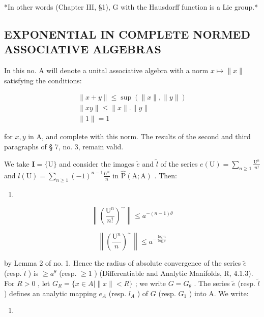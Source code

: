 *In other words (Chapter III, §1), G with the Hausdorff function is a Lie group.*

\subsection{EXPONENTIAL IN COMPLETE NORMED ASSOCIATIVE ALGEBRAS}

In this no. A will denote a unital associative algebra with a norm \(x \mapsto \| x \|\) satisfying the conditions:

\[
\begin{array}{c} \| x + y \| \leqslant \sup (\| x \|, \| y \|) \\ \| x y \| \leqslant \| x \|. \| y \| \\ \| 1 \| = 1 \end{array}
\]

for \(x, y\) in A, and complete with this norm. The results of the second and third paragraphs of § 7, no. 3, remain valid.

We take \(\mathbf{I} = \{\mathrm{U}\}\) and consider the images \(\tilde e\) and \(\tilde{l}\) of the series \(e(\mathrm{U}) = \sum_{n\geqslant 1}\frac{\mathrm{U}^n}{n!}\) and \(l(\mathrm{U}) = \sum_{n\geqslant 1}(-1)^{n - 1}\frac{U^n}{n}\) in \(\hat{\mathrm{P}} (\mathrm{A};\mathrm{A})\) . Then:

\begin{enumerate}
\def\labelenumi{(\arabic{enumi})}
\setcounter{enumi}{19}
\tightlist
\item
\end{enumerate}

\[
\left\| \left(\frac {\mathrm{U} ^ {n}}{n !}\right) ^ {\sim} \right\| \leqslant a ^ {- (n - 1) \theta}\tag{20}
\]

\[
\left\| \left(\frac {\mathrm{U} ^ {n}}{n}\right) ^ {\sim} \right\| \leqslant a ^ {- \frac {\log n}{\log p}}\tag{21}
\]

by Lemma 2 of no. 1. Hence the radius of absolute convergence of the series \(\tilde{e}\) (resp. \(\tilde{l}\) ) is \(\geqslant a^\theta\) (resp. \(\geqslant 1\) ) (Differentiable and Analytic Manifolds, R, 4.1.3). For \(R > 0\) , let \(G_R = \{x \in A \mid \|x\|<R\}\) ; we write \(G = G_\theta\) . The series \(\tilde{e}\) (resp. \(\tilde{l}\) ) defines an analytic mapping \(e_{A}\) (resp. \(l_{A}\) ) of \(G\) (resp. \(G_{1}\) ) into A. We write:

\begin{enumerate}
\def\labelenumi{(\arabic{enumi})}
\setcounter{enumi}{21}
\tightlist
\item
\end{enumerate}


